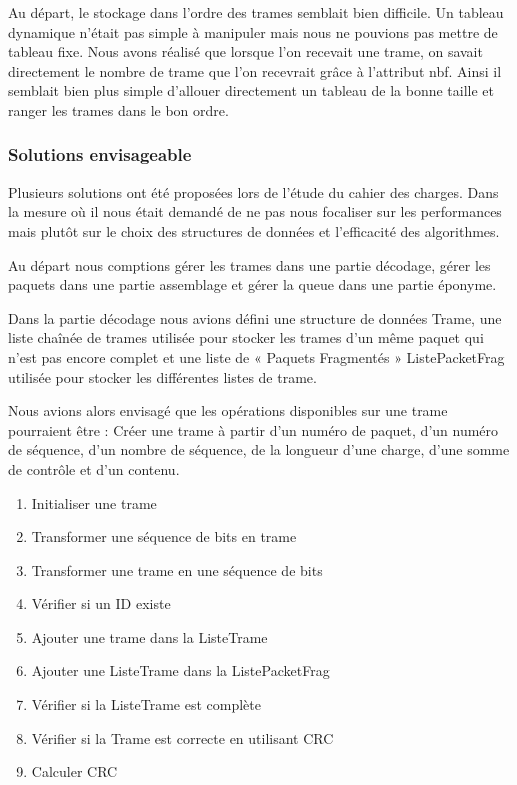 \documentclass[a4paper,11pt]{article}
\begin{document}
Au départ, le stockage dans l'ordre des trames semblait bien difficile. Un tableau dynamique n'était pas simple à manipuler mais nous ne pouvions pas mettre de tableau fixe. Nous avons réalisé que lorsque l'on recevait une trame, on savait directement le nombre de trame que l'on recevrait grâce à l’attribut nbf. Ainsi il semblait bien plus simple d'allouer directement un tableau de la bonne taille et ranger les trames dans le bon ordre.

\subsubsection{Solutions envisageable}

Plusieurs solutions ont été proposées lors de l'étude du cahier des charges. Dans la mesure où il nous était demandé de ne pas nous focaliser sur les performances mais plutôt sur le choix des structures de données et l'efficacité des algorithmes.

Au départ nous comptions gérer les trames dans une partie décodage, gérer les paquets dans une partie assemblage et gérer la queue dans une partie éponyme.
 
Dans la partie décodage nous avions défini une structure de données Trame, une liste chaînée de trames utilisée pour stocker les trames d'un même paquet qui n'est pas encore complet et une liste de « Paquets Fragmentés » ListePacketFrag utilisée pour stocker les différentes listes de trame.


Nous avions alors envisagé que les opérations disponibles sur une trame pourraient être :
Créer une trame à partir d'un numéro de paquet, d'un numéro de séquence, d'un nombre de séquence, de la longueur d'une charge, d'une somme de contrôle et d'un contenu.
\begin{enumerate}
 \item Initialiser une trame
 \item Transformer une séquence de bits en trame
 \item Transformer une trame en une séquence de bits
 \item Vérifier si un ID existe
 \item Ajouter une trame dans la ListeTrame
 \item Ajouter une ListeTrame dans la ListePacketFrag
 \item Vérifier si la ListeTrame est complète
 \item Vérifier si la Trame est correcte en utilisant CRC
 \item Calculer CRC
\end{enumerate}
\end{document}
